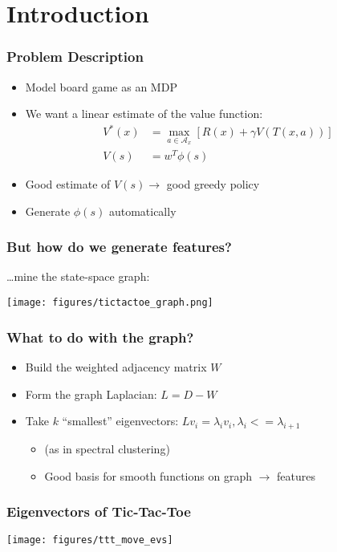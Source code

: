 \section{Introduction}

\begin{frame}
\frametitle{Problem Description}

\begin{itemize}
  \item Model board game as an MDP
  \item We want a linear estimate of the value function:
    \begin{align*}
        V^{*}(x) &= \max_{a \in \mathcal{A}_x} [ R(x) + \gamma V(T(x, a)) ]\\
        V(s)     &= w^{T}\phi(s)
    \end{align*}
  \item Good estimate of $V(s) \rightarrow$ good greedy policy
  \item Generate $\phi(s)$ automatically
\end{itemize}
\end{frame}

\begin{frame}
\frametitle{But how do we generate features?}
\dots mine the state-space graph:
\begin{center}
\texttt{[image: figures/tictactoe\_graph.png]}
\end{center}
\end{frame}

\begin{frame}
\frametitle{What to do with the graph?}
\begin{itemize}
  \item Build the weighted adjacency matrix $W$
  \item Form the graph Laplacian: $L = D-W $
  \item Take $k$ ``smallest'' eigenvectors: $Lv_{i} = \lambda_{i} v_{i}, \lambda_{i} <= \lambda_{i+1}$
    \begin{itemize}
        \item (as in spectral clustering)
        \item Good basis for smooth functions on graph $\rightarrow$ features 
    \end{itemize}
\end{itemize}
\end{frame}

\begin{frame}
\frametitle{Eigenvectors of Tic-Tac-Toe}
\texttt{[image: figures/ttt\_move\_evs]}
\end{frame}

